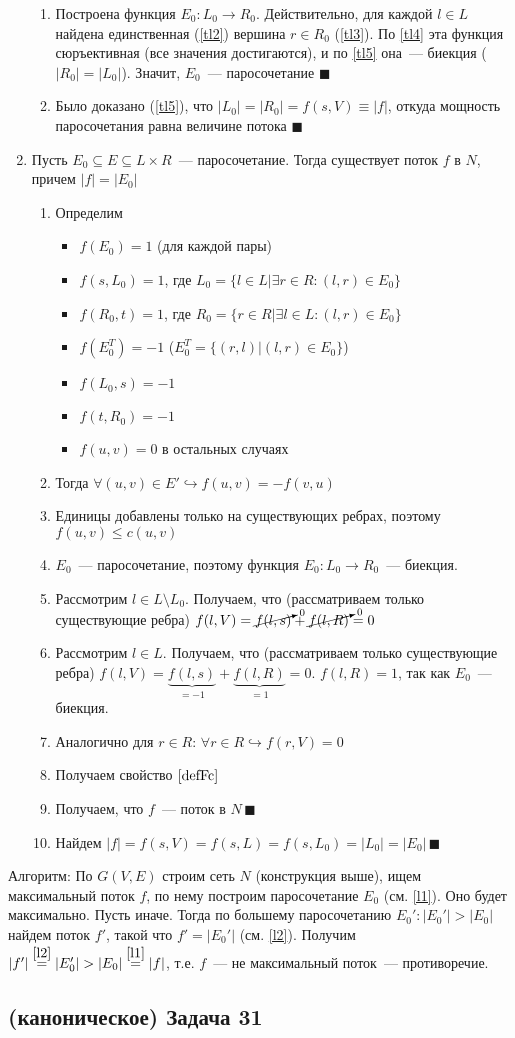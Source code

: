 \documentclass[a4paper]{article}
\begin{document}
\begin{enumerate}
\begin{enumerate}
\item Построена функция $E_0\colon L_0\to R_0$. Действительно, для каждой $l\in L$ найдена единственная (\ref{tl2}) вершина $r\in R_0$ (\ref{tl3}). По \ref{tl4} эта функция сюръективная (все значения достигаются), и по \ref{tl5} она~--- биекция ($|R_0|=|L_0|$). Значит, $E_0$~--- паросочетание $\blacksquare$
\item Было доказано (\ref{tl5}), что $|L_0|=|R_0|=f(s,V)\equiv |f|$, откуда мощность паросочетания равна величине потока $\blacksquare$
\end{enumerate}
\item \label{l2} Пусть $E_0\subseteq E\subseteq L\times R$~--- паросочетание. Тогда существует поток $f$ в $N$, причем $|f|=|E_0|$\begin{enumerate}
\item Определим\begin{itemize}
\item $f(E_0)=1$ (для каждой пары)
\item $f(s,L_0)=1$, где $L_0=\{l\in L\big|\exists r\in R\colon (l,r)\in E_0\}$
\item $f(R_0,t)=1$, где $R_0=\{r\in R\big|\exists l\in L\colon (l,r)\in E_0\}$
\item $f(E_0^T)=-1$ ($E_0^T=\{(r,l)\big|(l,r)\in E_0\}$)
\item $f(L_0,s)=-1$
\item $f(t,R_0)=-1$
\item $f(u,v)=0$ в остальных случаях
\end{itemize}
\item Тогда $\forall (u,v)\in E'\hookrightarrow f(u,v)=-f(v,u)$
\item Единицы добавлены только на существующих ребрах, поэтому $f(u,v)\leqslant c(u,v)$
\item $E_0$~--- паросочетание, поэтому функция $E_0\colon L_0\to R_0$~--- биекция.
\item Рассмотрим $l\in L\setminus L_0$. Получаем, что (рассматриваем только существующие ребра) $f(l,V)=\cancelto{0}{f(l,s)}+\cancelto{0}{f(l,R)}=0$
\item Рассмотрим $l\in L$. Получаем, что (рассматриваем только существующие ребра) $f(l,V)=\underbrace{f(l,s)}_{=-1}+\underbrace{f(l,R)}_{=1}=0$. $f(l,R)=1$, так как $E_0$~--- биекция.
\item Аналогично для $r\in R$: $\forall r\in R\hookrightarrow f(r,V)=0$
\item Получаем свойство $\ref{defFc}$
\item Получаем, что $f$~--- поток в $N\,\blacksquare$
\item Найдем $|f|=f(s,V)=f(s,L)=f(s,L_0)=|L_0|=|E_0|\,\blacksquare$
\end{enumerate}
\end{enumerate}
Алгоритм: По $G(V,E)$ строим сеть $N$ (конструкция выше), ищем максимальный поток $f$, по нему построим паросочетание $E_0$ (см. \ref{l1}).\newline
Оно будет максимально. Пусть иначе. Тогда по большему паросочетанию $E_0'\colon |E_0'|>|E_0|$ найдем поток $f'$, такой что $f'=|E_0'|$ (см. \ref{l2}). Получим $|f'|\overset{\ref{l2}}{=}|E_0'|>|E_0|\overset{\ref{l1}}{=}|f|$, т.е. $f$~--- не максимальный поток~--- противоречие.
\subsection*{(каноническое) Задача 31}
\end{document}
